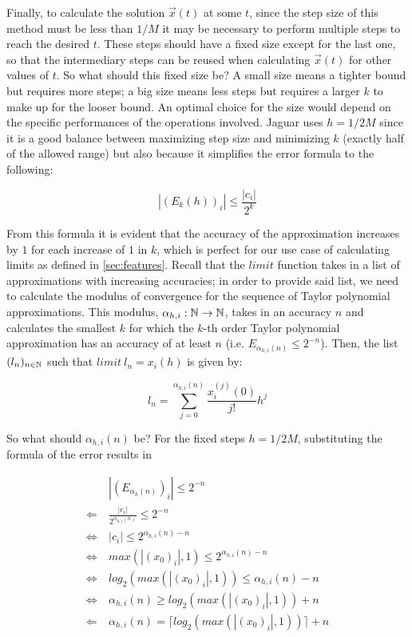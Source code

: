 Finally, to calculate the solution $\vec{x}(t)$ at some $t$, since the step size of this method must be less than $1/M$ it may be necessary to perform multiple steps to reach the desired $t$. These steps should have a fixed size except for the last one, so that the intermediary steps can be reused when calculating $\vec{x}(t)$ for other values of $t$. So what should this fixed size be? A small size means a tighter bound but requires more steps; a big size means less steps but requires a larger $k$ to make up for the looser bound. An optimal choice for the size would depend on the specific performances of the operations involved. Jaguar uses $h=1/2M$ since it is a good balance between maximizing step size and minimizing $k$ (exactly half of the allowed range) but also because it simplifies the error formula to the following:

\begin{equation*}
  |(E_k(h))_i| \leq \frac{|c_i|}{2^k}
\end{equation*}

From this formula it is evident that the accuracy of the approximation increases by $1$ for each increase of $1$ in $k$, which is perfect for our use case of calculating limits as defined in \cref{sec:features}. Recall that the $limit$ function takes in a list of approximations with increasing accuracies; in order to provide said list, we need to calculate the modulus of convergence for the sequence of Taylor polynomial approximations. This modulus, $\alpha_{h,i} : \mathbb{N} \rightarrow \mathbb{N}$, takes in an accuracy $n$ and calculates the smallest $k$ for which the $k$-th order Taylor polynomial approximation has an accuracy of at least $n$ (i.e. $E_{\alpha_{h,i}(n)} \leq 2^{-n}$). Then, the list $(l_n)_{n \in \mathbb{N}}$ such that $limit\ l_n = x_i(h)$ is given by:

\begin{equation*}
  l_n = \sum_{j=0}^{\alpha_{h,i}(n)} \frac{x_i^{(j)}(0)}{j!}h^j
\end{equation*}

So what should $\alpha_{h,i}(n)$ be? For the fixed steps $h=1/2M$, substituting the formula of the error results in

\begin{equation}
\label{eq:solver_step_dt}
  \begin{split}
    & |(E_{\alpha_h(n)})_i| \leq 2^{-n} \\
    \Leftarrow\ & \frac{|c_i|}{2^{\alpha_{h,i}(n)}} \leq 2^{-n} \\
    \Leftrightarrow\ & |c_i| \leq 2^{\alpha_{h,i}(n)-n} \\
    \Leftrightarrow\ & max(|(x_0)_i|, 1) \leq 2^{\alpha_{h,i}(n)-n} \\
    \Leftrightarrow\ & log_2(max(|(x_0)_i|, 1)) \leq \alpha_{h,i}(n)-n \\
    \Leftrightarrow\ & \alpha_{h,i}(n) \geq log_2(max(|(x_0)_i|, 1))+n \\
    \Leftarrow\ & \alpha_{h,i}(n) = \lceil log_2(max(|(x_0)_i|, 1)) \rceil +n
  \end{split}
\end{equation}


